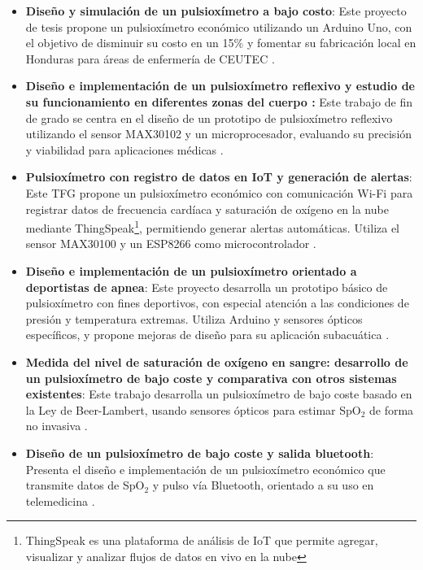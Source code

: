 \begin{itemize}
    \item \textbf{Diseño y simulación de un pulsioxímetro a bajo costo}: Este proyecto de tesis propone un pulsioxímetro económico utilizando un Arduino Uno, con el objetivo de disminuir su costo en un 15\% y fomentar su fabricación local en Honduras para áreas de enfermería de CEUTEC \cite{chacon2021pulsioximetro}.
    \item \textbf{Diseño e implementación de un pulsioxímetro reflexivo y estudio de su funcionamiento en diferentes zonas del cuerpo :} Este trabajo de fin de grado se centra en el diseño de un prototipo de pulsioxímetro reflexivo utilizando el sensor MAX30102 y un microprocesador, evaluando su precisión y viabilidad para aplicaciones médicas \cite{gonzalez2019pulsioximetro}.
    \item \textbf{Pulsioxímetro con registro de datos en IoT y generación de alertas}: Este TFG propone un pulsioxímetro económico con comunicación Wi-Fi para registrar datos de frecuencia cardíaca y saturación de oxígeno en la nube mediante ThingSpeak\footnote{ThingSpeak es una plataforma de análisis de IoT que permite agregar, visualizar y analizar flujos de datos en vivo en la nube}, permitiendo generar alertas automáticas. Utiliza el sensor MAX30100 y un ESP8266 como microcontrolador \cite{sein2019pulsioximetro}.
    \item \textbf{Diseño e implementación de un pulsioxímetro orientado a deportistas de apnea}: Este proyecto desarrolla un prototipo básico de pulsioxímetro con fines deportivos, con especial atención a las condiciones de presión y temperatura extremas. Utiliza Arduino y sensores ópticos específicos, y propone mejoras de diseño para su aplicación subacuática \cite{borbones2021pulsioximetro}.
    \item \textbf{Medida del nivel de saturación de oxígeno en sangre: desarrollo de un pulsioxímetro de bajo coste y comparativa con otros sistemas existentes}: Este trabajo desarrolla un pulsioxímetro de bajo coste basado en la Ley de Beer-Lambert, usando sensores ópticos para estimar SpO$_2$ de forma no invasiva \cite{Alarco2015}.
    \item \textbf{Diseño de un pulsioxímetro de bajo coste y salida bluetooth}: Presenta el diseño e implementación de un pulsioxímetro económico que transmite datos de SpO$_2$ y pulso vía Bluetooth, orientado a su uso en telemedicina \cite{jimenez2019pulsioximetro}.
\end{itemize}


